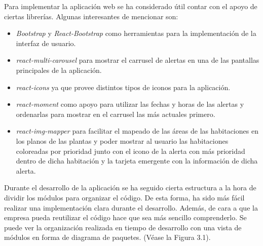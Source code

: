 Para implementar la aplicación web se ha considerado útil contar con el apoyo de ciertas librerías. Algunas interesantes de mencionar son:
\begin{itemize}
	\item \textit{Bootstrap} \cite{bootstrap} y \textit{React-Bootstrap} \cite{react-bootstrap} como herramientas para la implementación de la interfaz de usuario.
	\item \textit{react-multi-carousel} \cite{react-multi-carousel} para mostrar el carrusel de alertas en una de las pantallas principales de la aplicación.
	\item \textit{react-icons} \cite{react-icons} ya que provee distintos tipos de iconos para la aplicación.
	\item \textit{react-moment} \cite{react-moment} como apoyo para utilizar las fechas y horas de las alertas y ordenarlas para mostrar en el carrusel las más actuales primero.
	\item \textit{react-img-mapper} \cite{react-img-mapper} para facilitar el mapeado de las áreas de las habitaciones en los planos de las plantas y poder mostrar al usuario las habitaciones coloreadas por prioridad junto con el icono de la alerta con más prioridad dentro de dicha habitación y la tarjeta emergente con la información de dicha alerta.
\end{itemize}


Durante el desarrollo de la aplicación se ha seguido cierta estructura a la hora de dividir los módulos para organizar el código. De esta forma, ha sido más fácil realizar una implementación clara durante el desarrollo. Además, de cara a que la empresa pueda reutilizar el código hace que sea más sencillo comprenderlo. Se puede ver la organización realizada  en tiempo de desarrollo con una vista de módulos en forma de diagrama de paquetes. (Véase la Figura 3.1).\\

